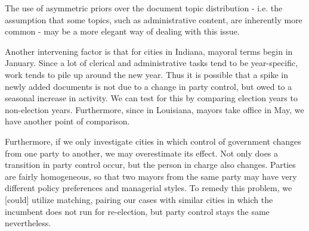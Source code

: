 \documentclass[11pt]{article}
\begin{document}
The use of asymmetric priors \citep{Wallach2009} over the document topic distribution - i.e. the assumption that some topics, such as administrative content, are inherently more common - may be a more elegant way of dealing with this issue.

Another intervening factor is that for cities in Indiana, mayoral terms begin in January. Since a lot of clerical and administrative tasks tend to be year-specific, work tends to pile up around the new year. Thus it is possible that a spike in newly added documents is not due to a change in party control, but owed to a seasonal increase in activity. We can test for this by comparing election years to non-election years. Furthermore, since in Louisiana, mayors take office in May, we have another point of comparison.

Furthermore, if we only investigate cities in which control of government changes from one party to another, we may overestimate its effect. Not only does a transition in party control occur, but the person in charge also changes. Parties are fairly homogeneous, so that two mayors from the same party may have very different policy preferences and managerial styles. To remedy this problem, we [could] utilize matching, pairing our cases with similar cities in which the incumbent does not run for re-election, but party control stays the same nevertheless.




\end{document}
